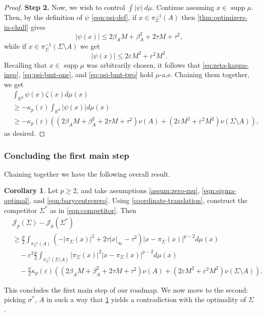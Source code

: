 \documentclass[preprint, reqno]{amsart}
\DeclareMathOperator*{\supp}{supp}
\renewcommand{\epsilon}{\varepsilon}
\theoremstyle{definition}
\newtheorem{corollary}[definition]{Corollary}
\numberwithin{equation}{section}
\begin{document}
\begin{proof}
  \textbf{Step 2.} Now, we wish to control $\int |\psi|\ d\mu$. Continue
  assuming $x \in \supp \mu$. Then, by the definition of $\psi$
  \eqref{eqn:psi-def}, if $x \in \pi_{\Sigma}^{-1}(A)$ then
  \cref{thm:optimizers-in-chull} gives
  \begin{equation}
    |\psi(x)| \leq  2\beta_A M  +\beta_A^2 +2\tau M +
    \tau^2, \label{eq:psi-bmt-one}
  \end{equation}
  while if $x \in \pi_{\Sigma}^{-1}(\Sigma \setminus A)$ we get
  \begin{equation}
    |\psi(x)| \leq 2\epsilon M^2 + \epsilon^2
    M^2. \label{eq:psi-bmt-two}
  \end{equation}
  Recalling that $x \in \supp \mu$ was arbitrarily chosen, it follows
  that \eqref{eq:zeta-kappa-ineq}, \eqref{eq:psi-bmt-one}, and
  \eqref{eq:psi-bmt-two} hold $\mu$-a.e. Chaining them together, we get
  \begin{align*}
    &\int_{\mathbb{R}^d}\psi(x)\zeta(x) d\mu(x)\\
    &\geq -\kappa_p(\epsilon)\int_{\mathbb{R}^d}|\psi(x)|d\mu(x)\\
    &\geq - \kappa_p (\epsilon)\left((2\beta_A M + \beta_A^2 + 2\tau M
      + \tau^2)\nu(A) + (2\epsilon M^2 + \epsilon^2 M^2)\nu (\Sigma
      \setminus A)\right),
  \end{align*}
  as desired.
\end{proof}

\subsubsection{Concluding the first main step} Chaining together
 we have the
following overall result.
\begin{corollary} \label{cor:step-one-summary}
  Let $p \geq 2$, and take assumptions \eqref{assum:zero-mu},
  \eqref{eqn:sigma-optimal}, and \eqref{eqn:barycentrezero}. Using
  \eqref{coordinate-translation}, construct the competitor $\Sigma^*$
  as in \eqref{eqn:competitor}. Then
  \begin{align*}
    & \mathscr{J}_p(\Sigma) - \mathscr{J}_p(\Sigma^*) \\
    & \ge \frac{p}{2} \int_{\pi_{\Sigma}^{-1}(A)}(-|\pi_{\Sigma}(x)|^2
      + 2 \tau |x |_{\infty} - \tau^2)|x -
      \pi_{\Sigma}(x)|^{p-2}d\mu(x) \\
    &\quad -\epsilon^2 \frac{p}{2} \int_{\pi_{\Sigma}^{-1}(\Sigma
      \setminus A)}|\pi_{\Sigma}(x)|^2 |x -
      \pi_{\Sigma}(x)|^{p-2}d\mu(x)\\
    & \quad - \frac{p}{2}\kappa_p(\epsilon)\left((2\beta_A M +
      \beta_A^2 + 2\tau M + \tau^2)\nu(A) + (2\epsilon M^2 +
      \epsilon^2 M^2)\nu(\Sigma \setminus A)\right).
  \end{align*}
\end{corollary}
This concludes the first main step of our roadmap. We now move to the
second: picking $\sigma^*$, $A$ in such a way that
\cref{cor:step-one-summary} yields a contradiction with the optimality
of $\Sigma$.
\end{document}

